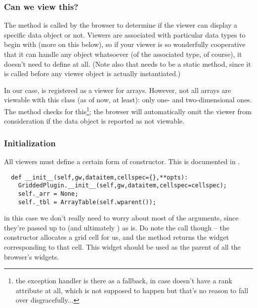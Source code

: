 \documentclass[12pt,twoside]{book}
\begin{document}
\subsubsection{Can we view this?} 

  The  method is called by the browser to determine if the
  viewer can display a specific data object or not. Viewers are associated with
  particular data types to begin with (more on this below), so if your viewer is
  so wonderfully cooperative that it can handle any object whatsoever (of the
  associated type, of course), it doesn't need to define  at
  all. (Note also that  needs to be a static method, since it
  is called before any viewer object is actually instantiated.)

  In our case,  is registered as a viewer for arrays. However,
  not all arrays are viewable with this class (as of now, at least): only one-
  and two-dimensional ones. The  method checks for
  this\footnote{the exception handler is there as a fallback, in case 
  doesn't have a rank attribute at all, which is not supposed to happen but
  that's no reason to fall over disgracefully...}; the browser will
  automatically omit the viewer from consideration if the data object is
  reported as not viewable. 

\subsubsection{Initialization} 

  All viewers must define a certain form of constructor. This is documented in
  .

\begin{verbatim}  
  def __init__(self,gw,dataitem,cellspec={},**opts):
    GriddedPlugin.__init__(self,gw,dataitem,cellspec=cellspec);
    self._arr = None;
    self._tbl = ArrayTable(self.wparent());
\end{verbatim}

  in this case we don't really need to worry about most of the arguments, since
  they're passed up to  (and ultimately ) as is.
  Do note the  call though -- the  constructor
  allocates a grid cell for us, and the  method returns the
  widget corresponding to that cell. This widget should be used as the parent 
  of all the browser's widgets.
\end{document}
